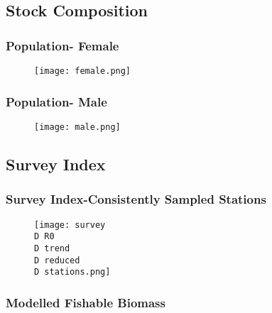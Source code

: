 \subsection{Stock Composition}
%
\begin{frame}
\frametitle{Population- Female}
\begin{figure}
%
%
\centerline{\texttt{[image: female.png]}}
%
%
%
 \end{figure}
\end{frame}
%
%
%
%
%
\begin{frame}
\frametitle{Population- Male}
\begin{figure}
%
%
\centerline{\texttt{[image: male.png]}}
%
%
%
 \end{figure}
\end{frame}

%
%
%
%
%
%
%
%
%
%
%
%
\subsection{Survey Index}
%
\begin{frame}
\frametitle{Survey Index-Consistently Sampled Stations}
\begin{figure}
%
%
\centerline{\texttt{[image: survey\\D R0\\D trend\\D reduced\\D stations.png]}}
%
%
%
 \end{figure}
\end{frame}

%
%
\begin{frame}
\frametitle{Modelled Fishable Biomass}
\begin{figure}


\\
   \
 

 \end{figure}
\end{frame}


